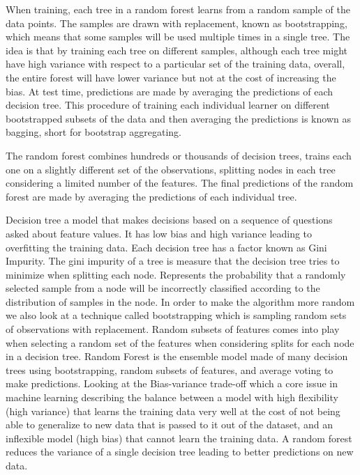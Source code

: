 \documentclass[12pt]{article}
\begin{document}
When training, each tree in a random forest learns from a random sample of the data points. The samples are drawn with replacement, known as bootstrapping, which means that some samples will be used multiple times in a single tree. The idea is that by training each tree on different samples, although each tree might have high variance with respect to a particular set of the training data, overall, the entire forest will have lower variance but not at the cost of increasing the bias. At test time, predictions are made by averaging the predictions of each decision tree. This procedure of training each individual learner on different bootstrapped subsets of the data and then averaging the predictions is known as bagging, short for bootstrap aggregating.

The random forest combines hundreds or thousands of decision trees, trains each one on a slightly different set of the observations, splitting nodes in each tree considering a limited number of the features. The final predictions of the random forest are made by averaging the predictions of each individual tree.

Decision tree a model that makes decisions based on a sequence of questions asked about feature values. It has low bias and high variance leading to overfitting the training data. Each decision tree has a factor known as Gini Impurity. The gini impurity of a tree is measure that the decision tree tries to minimize when splitting each node. Represents the probability that a randomly selected sample from a node will be incorrectly classified according to the distribution of samples in the node. In order to make the algorithm more random we also look at a technique called bootstrapping which is sampling random sets of observations with replacement. Random subsets of features comes into play when selecting a random set of the features when considering splits for each node in a decision tree. Random Forest is the ensemble model made of many decision trees using bootstrapping, random subsets of features, and average voting to make predictions. Looking at the Bias-variance trade-off which a core issue in machine learning describing the balance between a model with high flexibility (high variance) that learns the training data very well at the cost of not being able to generalize to new data that is passed to it out of the dataset, and an inflexible model (high bias) that cannot learn the training data. A random forest reduces the variance of a single decision tree leading to better predictions on new data.
\end{document}
